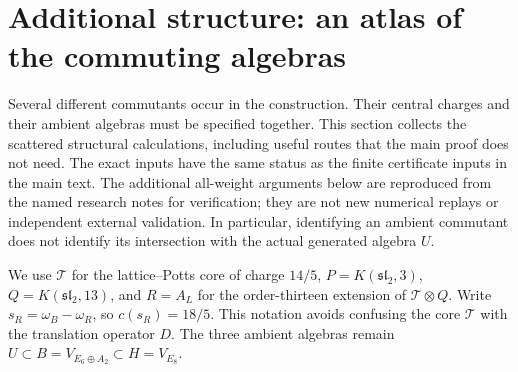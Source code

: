 
\section{Additional structure: an atlas of the commuting algebras}
\label{expstructure:atlas}

Several different commutants occur in the construction. Their central
charges and their ambient algebras must be specified together. This
section collects the scattered structural calculations, including useful
routes that the main proof does not need. The exact inputs have the same
status as the finite certificate inputs in the main text. The additional
all-weight arguments below are reproduced from the named research notes
for verification; they are not new numerical replays or independent
external validation. In particular, identifying an ambient commutant
does not identify its intersection with the actual generated algebra
$U$.

We use $\mathcal T$ for the lattice--Potts core of charge $14/5$,
$P=K(\mathfrak{sl}_2,3)$, $Q=K(\mathfrak{sl}_2,13)$, and $R=A_L$
for the order-thirteen extension of $\mathcal T\otimes Q$. Write
$s_R=\omega_B-\omega_R$, so $c(s_R)=18/5$. This notation avoids
confusing the core $\mathcal T$ with the translation operator $D$.
The three ambient algebras remain
$U\subset B=V_{E_6\oplus A_2}\subset H=V_{E_8}$.

